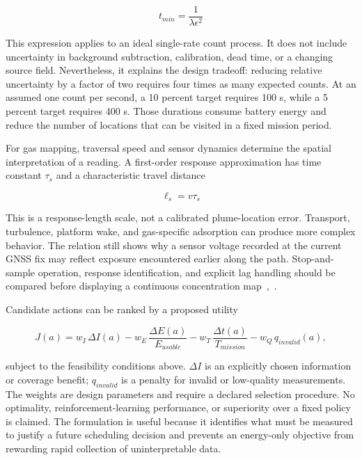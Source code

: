 \documentclass[11pt,letterpaper]{article}
\begin{document}
\begin{equation}
t_{min}=\frac{1}{\lambda\epsilon^2}
\label{eq:18}
\end{equation}

This expression applies to an ideal single-rate count process. It does not include uncertainty in background subtraction, calibration, dead time, or a changing source field. Nevertheless, it explains the design tradeoff: reducing relative uncertainty by a factor of two requires four times as many expected counts. At an assumed one count per second, a 10 percent target requires 100 s, while a 5 percent target requires 400 s. Those durations consume battery energy and reduce the number of locations that can be visited in a fixed mission period.

For gas mapping, traversal speed and sensor dynamics determine the spatial interpretation of a reading. A first-order response approximation has time constant \(\tau_s\) and a characteristic travel distance

\begin{equation}
\ell_s=v\tau_s
\label{eq:19}
\end{equation}

This is a response-length scale, not a calibrated plume-location error. Transport, turbulence, platform wake, and gas-specific adsorption can produce more complex behavior. The relation still shows why a sensor voltage recorded at the current GNSS fix may reflect exposure encountered earlier along the path. Stop-and-sample operation, response identification, and explicit lag handling should be compared before displaying a continuous concentration map~\cite{LIT_GAS2019},~\cite{LIT_GADEN2017}.

Candidate actions can be ranked by a proposed utility

\begin{equation}
J(a)=w_I\,\Delta I(a)-w_E\,\frac{\Delta E(a)}{E_{usable}}-w_T\,\frac{\Delta t(a)}{T_{mission}}-w_Q\,q_{invalid}(a),
\label{eq:20}
\end{equation}

subject to the feasibility conditions above. \(\Delta I\) is an explicitly chosen information or coverage benefit; \(q_{invalid}\) is a penalty for invalid or low-quality measurements. The weights are design parameters and require a declared selection procedure. No optimality, reinforcement-learning performance, or superiority over a fixed policy is claimed. The formulation is useful because it identifies what must be measured to justify a future scheduling decision and prevents an energy-only objective from rewarding rapid collection of uninterpretable data.
\end{document}
